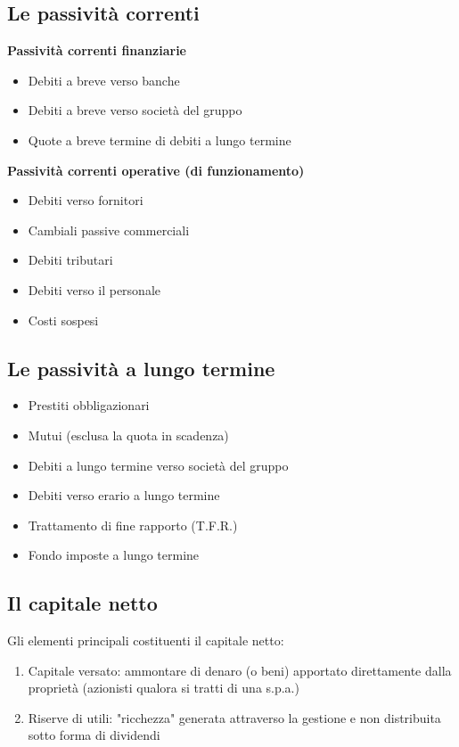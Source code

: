 \documentclass{article}
\begin{document}
\subsection{Le passività correnti}
\textbf{Passività correnti finanziarie}
\begin{itemize}
    \item Debiti a breve verso banche
    \item Debiti a breve verso società del gruppo
    \item Quote a breve termine di debiti a lungo termine
\end{itemize}
\textbf{Passività correnti operative (di funzionamento)}
\begin{itemize}
    \item Debiti verso fornitori
    \item Cambiali passive commerciali
    \item Debiti tributari
    \item Debiti verso il personale
    \item Costi sospesi
\end{itemize}





\subsection{Le passività a lungo termine}
\begin{itemize}
    \item Prestiti obbligazionari
    \item Mutui (esclusa la quota in scadenza)
    \item Debiti a lungo termine verso società del gruppo
    \item Debiti verso erario a lungo termine
    \item Trattamento di fine rapporto (T.F.R.)
    \item Fondo imposte a lungo termine
\end{itemize}



\subsection{Il capitale netto}
Gli elementi principali costituenti il capitale netto:
\begin{enumerate}
    \item Capitale versato: ammontare di denaro (o beni) apportato direttamente dalla proprietà (azionisti qualora si tratti di una s.p.a.)
    \item Riserve di utili: "ricchezza" generata attraverso la gestione e non distribuita sotto forma di dividendi
\end{enumerate}
\end{document}
